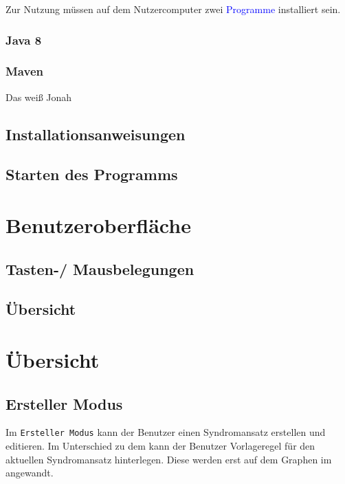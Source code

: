 \documentclass[enabledeprecatedfontcommands,fontsize=11pt,paper=a4,twoside]{scrartcl}
\newcommand*{\blue}{\textcolor{blue}}
\begin{document}
	Zur Nutzung müssen auf dem Nutzercomputer zwei \blue{Programme} installiert sein.

	\subsubsection{Java 8}
	\subsubsection{Maven}
	Das weiß Jonah

	\subsection{Installationsanweisungen}
	\subsection{Starten des Programms}

\newpage	
\section{Benutzeroberfläche}
	\subsection{Tasten-/ Mausbelegungen}
	\subsection{Übersicht}
	
\newpage	
\section{Übersicht} \label{sec:uebersicht}
\subsection{Ersteller Modus}
Im \texttt{Ersteller Modus} kann der Benutzer einen Syndromansatz erstellen und editieren. Im Unterschied zu dem  kann der Benutzer Vorlageregel für den aktuellen Syndromansatz hinterlegen. Diese werden erst auf dem Graphen im  angewandt. 
\end{document}
